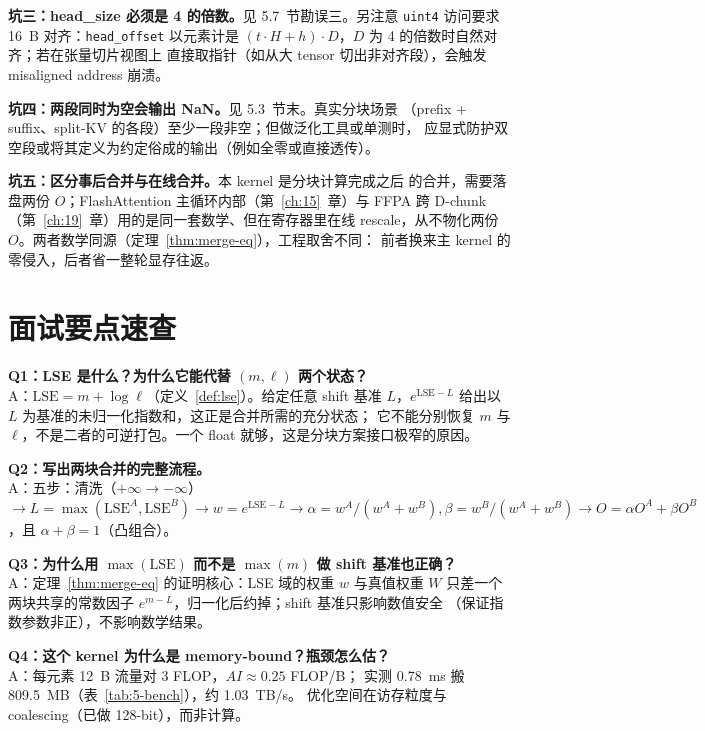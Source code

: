 \textbf{坑三：head\_size 必须是 4 的倍数。}见 5.7~节勘误三。另注意
\texttt{uint4} 访问要求 16~B 对齐：\texttt{head\_offset} 以元素计是
$(t \cdot H + h) \cdot D$，$D$ 为 4 的倍数时自然对齐；若在张量切片视图上
直接取指针（如从大 tensor 切出非对齐段），会触发 misaligned address 崩溃。

\textbf{坑四：两段同时为空会输出 NaN。}见 5.3~节末。真实分块场景
（prefix + suffix、split-KV 的各段）至少一段非空；但做泛化工具或单测时，
应显式防护双空段或将其定义为约定俗成的输出（例如全零或直接透传）。

\textbf{坑五：区分事后合并与在线合并。}本 kernel 是分块计算完成之后
的合并，需要落盘两份 $O$；FlashAttention 主循环内部（第~\ref{ch:15}~章）与
FFPA 跨 D-chunk（第~\ref{ch:19}~章）用的是同一套数学、但在寄存器里在线
rescale，从不物化两份 $O$。两者数学同源（定理~\ref{thm:merge-eq}），工程取舍不同：
前者换来主 kernel 的零侵入，后者省一整轮显存往返。

\section{面试要点速查}

\textbf{Q1：LSE 是什么？为什么它能代替 $(m, \ell)$ 两个状态？}\\
A：$\mathrm{LSE} = m + \log \ell$（定义~\ref{def:lse}）。给定任意 shift 基准
$L$，$e^{\mathrm{LSE} - L}$ 给出以 $L$ 为基准的未归一化指数和，这正是合并所需的充分状态；
它不能分别恢复 $m$ 与 $\ell$，不是二者的可逆打包。一个 float 就够，这是分块方案接口极窄的原因。

\textbf{Q2：写出两块合并的完整流程。}\\
A：五步：清洗（$+\infty \to -\infty$）$\to L = \max(\mathrm{LSE}^{A},
\mathrm{LSE}^{B}) \to w = e^{\mathrm{LSE} - L} \to
\alpha = w^{A}/(w^{A}+w^{B}), \beta = w^{B}/(w^{A}+w^{B}) \to
O = \alpha O^{A} + \beta O^{B}$，且 $\alpha + \beta = 1$（凸组合）。

\textbf{Q3：为什么用 $\max(\mathrm{LSE})$ 而不是 $\max(m)$ 做 shift 基准也正确？}\\
A：定理~\ref{thm:merge-eq} 的证明核心：LSE 域的权重 $w$ 与真值权重 $W$ 只差一个
两块共享的常数因子 $e^{m - L}$，归一化后约掉；shift 基准只影响数值安全
（保证指数参数非正），不影响数学结果。

\textbf{Q4：这个 kernel 为什么是 memory-bound？瓶颈怎么估？}\\
A：每元素 12~B 流量对 3 FLOP，$AI \approx 0.25$ FLOP/B；
实测 0.78~ms 搬 809.5~MB（表~\ref{tab:5-bench}），约 1.03~TB/s。
优化空间在访存粒度与 coalescing（已做 128-bit），而非计算。

